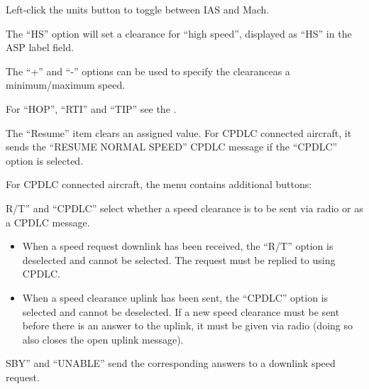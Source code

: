 \documentclass[a4paper,oneside,11pt]{memoir}
\begin{document}
\bigskip

Left-click the units button to toggle between IAS and Mach.

\bigskip

The “HS” option will set a clearance for “high speed”, displayed as “HS” in the ASP label field.

\bigskip

The “+” and “-” options can be used to specify the clearanceas a minimum/maximum speed.

\bigskip

For “HOP”, “RTI” and “TIP” see the .

\bigskip

The “Resume” item clears an assigned value. For CPDLC connected aircraft, it sends the “RESUME NORMAL SPEED” CPDLC message if the “CPDLC” option is selected.


For CPDLC connected aircraft, the menu contains additional buttons:

\bigskip

R/T” and “CPDLC” select whether a speed clearance is to be sent via radio or as a CPDLC message.

\bigskip

\begin{itemize}
    \item When a speed request downlink has been received, the “R/T” option is deselected and cannot be selected. The request must be replied to using CPDLC.
    \item When a speed clearance uplink has been sent, the “CPDLC” option is selected and cannot be deselected. If a new speed clearance must be sent before there is an answer to the uplink, it must be given via radio (doing so also closes the open uplink message).
\end{itemize}

\bigskip

SBY” and “UNABLE” send the corresponding answers to a downlink speed request.

\end{document}
